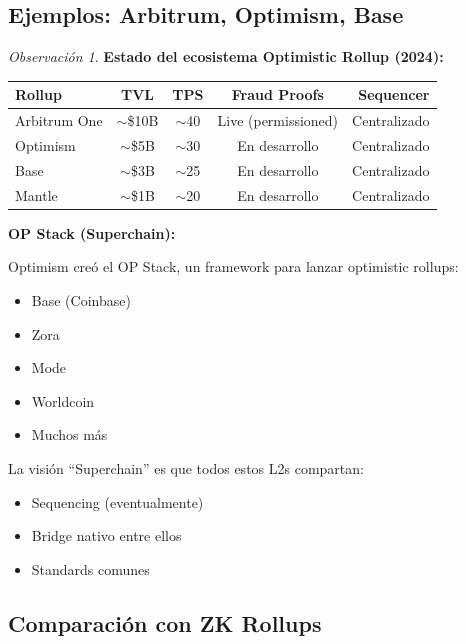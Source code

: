 \documentclass[11pt,a4paper,twoside,openright]{book}
\theoremstyle{definition}
\theoremstyle{plain}
\theoremstyle{remark}
\newtheorem{remark}{Observación}[chapter]
\begin{document}
\subsection{Ejemplos: Arbitrum, Optimism, Base}

\begin{remark}
\textbf{Estado del ecosistema Optimistic Rollup (2024):}

\begin{center}
\begin{tabular}{lcccr}
\toprule
\textbf{Rollup} & \textbf{TVL} & \textbf{TPS} & \textbf{Fraud Proofs} & \textbf{Sequencer} \\
\midrule
Arbitrum One & $\sim$\$10B & $\sim$40 & Live (permissioned) & Centralizado \\
Optimism & $\sim$\$5B & $\sim$30 & En desarrollo & Centralizado \\
Base & $\sim$\$3B & $\sim$25 & En desarrollo & Centralizado \\
Mantle & $\sim$\$1B & $\sim$20 & En desarrollo & Centralizado \\
\bottomrule
\end{tabular}
\end{center}

\textbf{OP Stack (Superchain):}

Optimism creó el OP Stack, un framework para lanzar optimistic rollups:
\begin{itemize}
    \item Base (Coinbase)
    \item Zora
    \item Mode
    \item Worldcoin
    \item Muchos más
\end{itemize}

La visión ``Superchain'' es que todos estos L2s compartan:
\begin{itemize}
    \item Sequencing (eventualmente)
    \item Bridge nativo entre ellos
    \item Standards comunes
\end{itemize}
\end{remark}

\subsection{Comparación con ZK Rollups}
\end{document}
